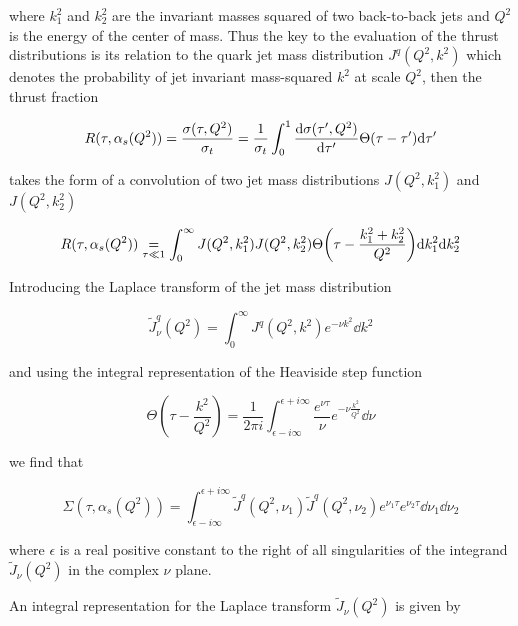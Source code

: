 \documentclass[../main.tex]{subfiles}
\begin{document}
where $k_1^2$ and $k_2^2$ are the invariant masses squared of two back-to-back jets and $Q^2$ is the energy of the center of mass.
Thus the key to the evaluation of the thrust distributions is its relation to the quark jet mass distribution $J^q(Q^2,k^2)$ which denotes
the probability of jet invariant mass-squared $k^2$ at scale $Q^2$, then the thrust fraction 

\begin{equation}
    R(\tau,\alpha_s(Q^2)) = \frac{\sigma(\tau,Q^2)}{\sigma_t} = \frac{1}{\sigma_t} 
    \int_0^1 \dv{\sigma(\tau',Q^2)}{\tau'} \Theta (\tau - \tau') \dd \tau'
\end{equation}

takes the form of a convolution of two jet mass distributions $J(Q^2,k_1^2)$ and $J(Q^2,k_2^2)$

\begin{equation}
    R(\tau,\alpha_s(Q^2)) \underset{\tau \ll 1}{=} \int_0^\infty J(Q^2,k_1^2) J(Q^2,k_2^2) \Theta\qty(\tau - \frac{k_1^2+k_2^2}{Q^2}) \dd k_1^2 \dd k_2^2
\end{equation}

Introducing the Laplace transform of the jet mass distribution

\begin{equation}\label{eq:laplace_jet_mass}
    \tilde{J}^q_\nu(Q^2) = \int_0^\infty J^q(Q^2,k^2) e^{-\nu k^2} \dd k^2 
\end{equation}

and using the integral representation of the Heaviside step function

\begin{equation} \label{eq:heaviside_integral_representation}
    \Theta(\tau - \frac{k^2}{Q^2}) = \frac{1}{2\pi i} \int_{\epsilon-i\infty}^{\epsilon+i\infty} \frac{e^{\nu \tau}}{\nu} e^{- \nu \frac{k^2}{Q^2}} \dd \nu
\end{equation}

we find that 

\begin{equation}
    \Sigma(\tau,\alpha_s(Q^2)) = \int_{\epsilon - i \infty}^{\epsilon+i\infty} \tilde{J}^q(Q^2,\nu_1) \tilde{J}^q(Q^2,\nu_2) e^{\nu_1 \tau} e^{\nu_2 \tau} \dd \nu_1 \dd \nu_2
\end{equation}

where $\epsilon$ is a real positive constant to the right of all singularities of the integrand $\tilde{J}_\nu(Q^2)$ in the complex $\nu$ plane. 

An integral representation for the Laplace transform $\tilde{J}_\nu(Q^2)$ is given by
\end{document}
